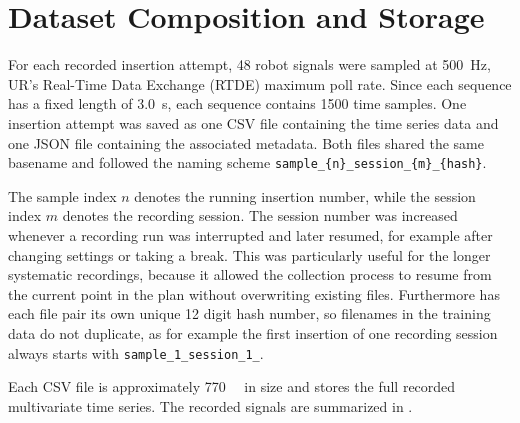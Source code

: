 \section{Dataset Composition and Storage}\label{sec:dataset_composition}

For each recorded insertion attempt, 48 robot signals were sampled at \SI{500}{\hertz}, UR's Real-Time Data Exchange (RTDE) maximum poll rate\cite{ur-rtde-guide}. Since each sequence has a fixed length of \SI{3.0}{\second}, each sequence contains 1500 time samples. One insertion attempt was saved as one CSV file containing the time series data and one JSON file containing the associated metadata. Both files shared the same basename and followed the naming scheme \texttt{sample\_\{n\}\_session\_\{m\}\_\{hash\}}.

The sample index $n$ denotes the running insertion number, while the session index $m$ denotes the recording session. The session number was increased whenever a recording run was interrupted and later resumed, for example after changing settings or taking a break. This was particularly useful for the longer systematic recordings, because it allowed the collection process to resume from the current point in the plan without overwriting existing files. Furthermore has each file pair its own unique 12 digit hash number, so filenames in the training data do not duplicate, as for example the first insertion of one recording session always starts with \texttt{sample\_1\_session\_1\_}.

Each CSV file is approximately \SI{770}{\kilo\byte} in size and stores the full recorded multivariate time series. The recorded signals are summarized in .

